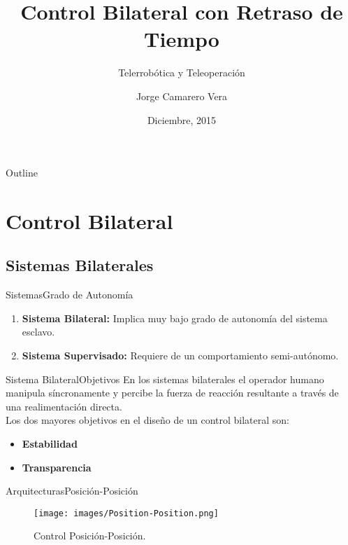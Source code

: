 \documentclass{beamer}
\title{Control Bilateral con Retraso de Tiempo}
\subtitle{Telerrobótica y Teleoperación}
\author{Jorge Camarero Vera}
\institute[07052] %
{
  Máster en Automática y Robótica\\
  Universidad Politécnica de Madrid
}
\date{Diciembre, 2015}
\begin{document}
\begin{frame}
  \titlepage
\end{frame}

\begin{frame}{Outline}
  \tableofcontents
\end{frame}

\section{Control Bilateral}


\subsection{Sistemas Bilaterales}
%

\begin{frame}{Sistemas}{Grado de Autonomía}
	\begin{enumerate}
		\item \textbf{Sistema Bilateral:} Implica muy bajo grado de autonomía del sistema esclavo.
		\item \textbf{Sistema Supervisado:} Requiere de un comportamiento semi-autónomo.
	\end{enumerate}
\end{frame}

\begin{frame}{Sistema Bilateral}{Objetivos}
	En los sistemas bilaterales el operador humano manipula síncronamente y percibe la fuerza de reacción resultante a través de una realimentación directa.\\
	\medskip
	Los dos mayores objetivos en el diseño de un control bilateral son:
	\begin{itemize}
		\item \textbf{Estabilidad}
		\item \textbf{Transparencia}
	\end{itemize}
\end{frame}

\begin{frame}{Arquitecturas}{Posición-Posición}
	\begin{figure}[h!]
		\centering
		\texttt{[image: images/Position-Position.png]}
		\caption{Control Posición-Posición.}
		\label{POSPOS}
	\end{figure}
\end{frame}
\end{document}
